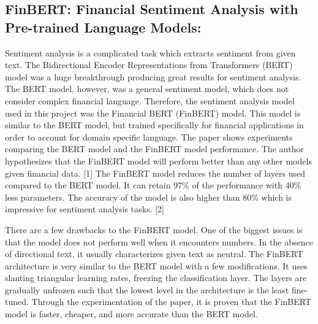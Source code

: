 \documentclass[12pt,a4paper, twoside]{article}
\begin{document}
\begin{multicols}{2}
\subsection{FinBERT: Financial Sentiment Analysis with Pre-trained Language Models:}
Sentiment analysis is a complicated task which extracts sentiment from given text. The Bidirectional Encoder Representations from Transformers (BERT) model was a huge breakthrough producing great results for sentiment analysis. The BERT model, however, was a general sentiment model, which does not consider complex financial language. Therefore, the sentiment analysis model used in this project was the Financial BERT (FinBERT) model. This model is similar to the BERT model, but trained specifically for financial applications in order to account for domain specific language. The paper shows experiments comparing the BERT model and the FinBERT model performance. The author hypothesizes that the FinBERT model will perform better than any other models given financial data. [1] The FinBERT model reduces the number of layers used compared to the BERT model. It can retain 97\% of the performance with 40\% less parameters. The accuracy of the model is also higher than 80\% which is impressive for sentiment analysis tasks. [2]

There are a few drawbacks to the FinBERT model. One of the biggest issues is that the model does not perform well when it encounters numbers. In the absence of directional text, it usually characterizes given text as neutral. The FinBERT architecture is very similar to the BERT model with a few modifications. It uses slanting triangular learning rates, freezing the classification layer. The layers are gradually unfrozen such that the lowest level in the architecture is the least fine-tuned. Through the experimentation of the paper, it is proven that the FinBERT model is faster, cheaper, and more accurate than the BERT model.


\end{multicols}
\end{document}
